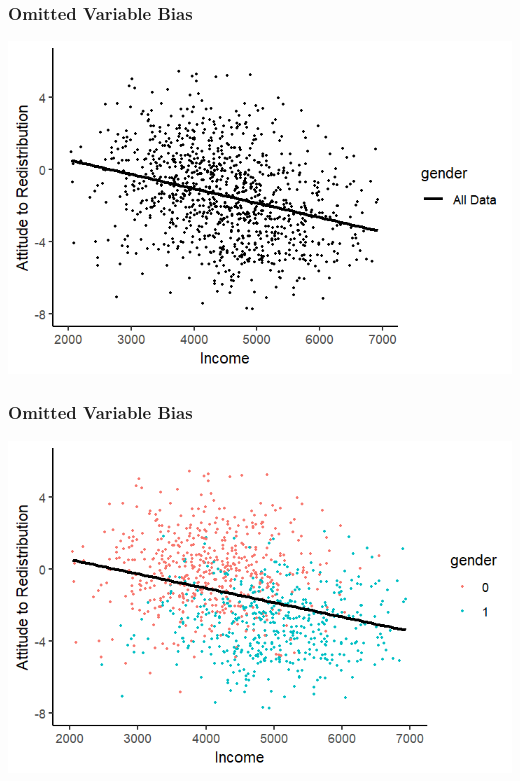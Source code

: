 \documentclass[xcolor=x11names,compress]{beamer}\usepackage[]{graphicx}\usepackage[]{color}
\makeatletter
\def\maxwidth{ %
  \ifdim\Gin@nat@width>\linewidth
    \linewidth
  \else
    \Gin@nat@width
  \fi
}
\newenvironment{knitrout}{}{} %
\renewcommand{\(}{\begin{columns}}
\renewcommand{\)}{\end{columns}}
\newcommand{\<}[1]{\begin{column}{#1}}
\renewcommand{\>}{\end{column}}
\makeatother
\begin{document}
\begin{frame}
\frametitle{Omitted Variable Bias}
\begin{knitrout}
\color{fgcolor}
\includegraphics[width=\maxwidth]{figure/confound3c-1} 

\end{knitrout}
\end{frame}

\begin{frame}
\frametitle{Omitted Variable Bias}
\begin{knitrout}
\color{fgcolor}
\includegraphics[width=\maxwidth]{figure/confound2-1} 

\end{knitrout}
\end{frame}
\end{document}
